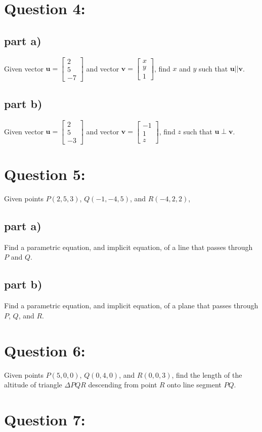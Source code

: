 \documentclass{article}
\newcommand{\colvec}[3]{\begin{bmatrix} #1 \\ #2 \\ #3 \end{bmatrix}}
\begin{document}
\section*{Question 4:}

\subsection*{part a)}

Given vector \(\mathbf{u} = \colvec{2}{5}{-7}\) and vector \(\mathbf{v} = \colvec{x}{y}{1}\), find \(x\) and \(y\) such that \(\mathbf{u} || \mathbf{v}\).

\subsection*{part b)}

Given vector \(\mathbf{u} = \colvec{2}{5}{-3}\) and vector \(\mathbf{v} = \colvec{-1}{1}{z}\), find \(z\) such that \(\mathbf{u} \perp \mathbf{v}\).



\section*{Question 5:}

Given points \(P(2,5,3)\), \(Q(-1,-4,5)\), and \(R(-4,2,2)\),

\subsection*{part a)}

Find a parametric equation, and implicit equation, of a line that passes through \(P\) and \(Q\). 

\subsection*{part b)}

Find a parametric equation, and implicit equation, of a plane that passes through \(P\), \(Q\), and \(R\).



\section*{Question 6:}

Given points \(P(5,0,0)\), \(Q(0,4,0)\), and \(R(0,0,3)\), find the length of the altitude of triangle \(\Delta PQR\) descending from point \(R\) onto line segment \(PQ\).   



\section*{Question 7:}
\end{document}
